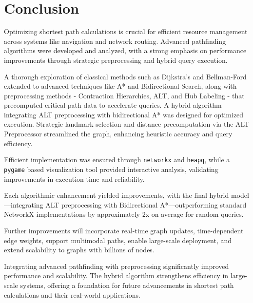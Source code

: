 \chapter{Conclusion}


Optimizing shortest path calculations is crucial for efficient resource management across systems like navigation and network routing. Advanced pathfinding algorithms were developed and analyzed, with a strong emphasis on performance improvements through strategic preprocessing and hybrid query execution.  \\ \medskip

A thorough exploration of classical methods such as Dijkstra’s and Bellman-Ford extended to advanced techniques like A* and Bidirectional Search, along with preprocessing methods - Contraction Hierarchies, ALT, and Hub Labeling - that precomputed critical path data to accelerate queries. A hybrid algorithm integrating ALT preprocessing with bidirectional A* was designed for optimized execution. Strategic landmark selection and distance precomputation via the ALT Preprocessor streamlined the graph, enhancing heuristic accuracy and query efficiency. \\ \medskip

Efficient implementation was ensured through \texttt{networkx} and \texttt{heapq}, while a \texttt{pygame} based visualization tool provided interactive analysis, validating improvements in execution time and reliability.  \\ \medskip

Each algorithmic enhancement yielded improvements, with the final hybrid model—integrating ALT preprocessing with Bidirectional A*—outperforming standard NetworkX implementations by approximately 2x on average for random queries. \\ \medskip

Further improvements will incorporate real-time graph updates, time-dependent edge weights, support multimodal paths, enable large-scale deployment, and extend scalability to graphs with billions of nodes.  \\ \medskip

Integrating advanced pathfinding with preprocessing significantly improved performance and scalability. The hybrid algorithm strengthens efficiency in large-scale systems, offering a foundation for future advancements in shortest path calculations and their real-world applications.
